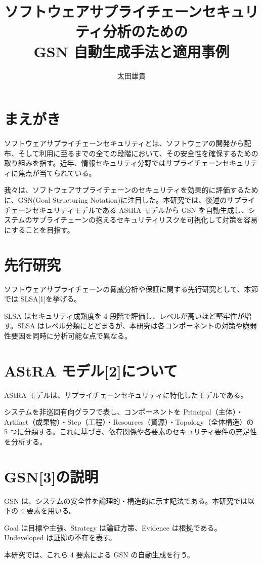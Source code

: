 \documentclass[twocolumn,a4paper,10pt]{ltjsarticle}
\title{ソフトウェアサプライチェーンセキュリティ分析のための\\GSN 自動生成手法と適用事例}
\author{太田雄貴}
\date{}
\begin{document}
\maketitle

\section{まえがき}
ソフトウェアサプライチェーンセキュリティとは、ソフトウェアの開発から配布、そして利用に至るまでの全ての段階において、その安全性を確保するための取り組みを指す。近年、情報セキュリティ分野ではサプライチェーンセキュリティに焦点が当てられている。

我々は、ソフトウェアサプライチェーンのセキュリティを効果的に評価するために、GSN(Goal Structuring Notation)に注目した。本研究では、後述のサプライチェーンセキュリティモデルである AStRA モデルから GSN を自動生成し、システムのサプライチェーンの抱えるセキュリティリスクを可視化して対策を容易にすることを目指す。

\section{先行研究}
ソフトウェアサプライチェーンの脅威分析や保証に関する先行研究として、本節では SLSA[1]を挙げる。

SLSA はセキュリティ成熟度を 4 段階で評価し、レベルが高いほど堅牢性が増す。SLSA はレベル分類にとどまるが、本研究は各コンポーネントの対策や脆弱性要因を同時に分析可能な点で異なる。

\section{AStRA モデル[2]について}
AStRA モデルは、サプライチェーンセキュリティに特化したモデルである。

システムを非巡回有向グラフで表し、コンポーネントを Principal（主体）・Artifact（成果物）・Step（工程）・Resources（資源）・Topology（全体構造）の 5 つに分類する。これに基づき、依存関係や各要素のセキュリティ要件の充足性を分析する。

\section{GSN[3]の説明}
GSN は、システムの安全性を論理的・構造的に示す記法である。本研究では以下の 4 要素を用いる。

Goal は目標や主張、Strategy は論証方策、Evidence は根拠である。Undeveloped は証拠の不在を表す。

本研究では、これら 4 要素による GSN の自動生成を行う。
\end{document}
